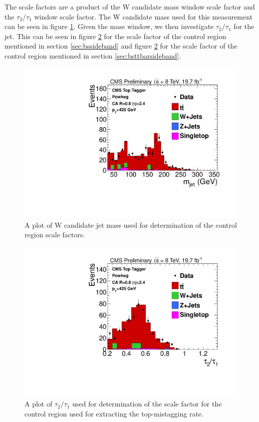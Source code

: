 The scale factors are a product of the W candidate mass window scale factor and the $\tau_2/\tau_1$ window scale factor.  The W candidate mass used for this measurement can be seen in figure \ref{figs:bsmassCRSF}.
Given the mass window, we then investigate $\tau_2/\tau_1$ for the jet.  This can be seen in figure \ref{figs:bsNsubCRSF1} for the scale factor of the control region mentioned in section \ref{sec:bssideband} and 
figure \ref{figs:bsNsubCRSF1}  for the scale factor of the control region mentioned in section \ref{sec:bsttbarsideband}.

\begin{figure}[htcb]
\centering
\includegraphics[width=1.0\textwidth]{AN-14-049/figs/semiLepMassbstar_t1TopMass_POWHEG_TTWeight.pdf}
\caption{A plot of W candidate jet mass used for determination of the control region scale factors. }
\label{figs:bsmassCRSF}
\end{figure}

\begin{figure}[htcb]
\centering
\includegraphics[width=1.0\textwidth]{AN-14-049/figs/semiLepMassbstar1_t1Tau21_POWHEG_TTWeight.pdf}
\caption{A plot of $\tau_2/\tau_1$ used for determination of the scale factor for the control region used for extracting the top-mistagging rate. }
\label{figs:bsNsubCRSF1}
\end{figure}

